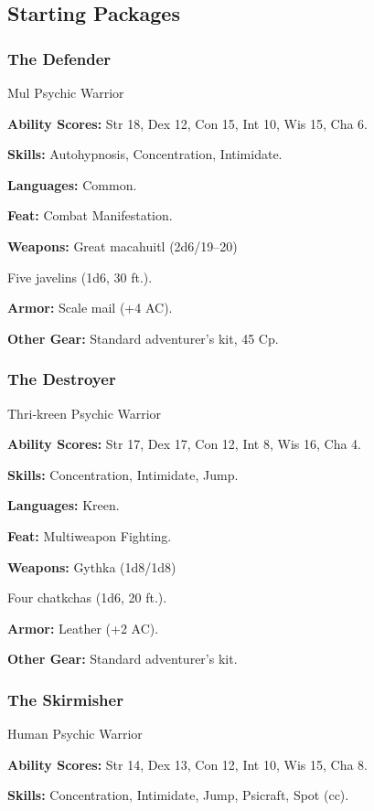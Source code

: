 \subsection{Starting Packages}
\subsubsection{The Defender}

Mul Psychic Warrior

\textbf{Ability Scores:} Str 18, Dex 12, Con 15, Int 10, Wis 15, Cha 6.

\textbf{Skills:} Autohypnosis, Concentration, Intimidate.

\textbf{Languages:} Common.

\textbf{Feat:} Combat Manifestation.

\textbf{Weapons:} Great macahuitl (2d6/19–20)

Five javelins (1d6, 30 ft.).

\textbf{Armor:} Scale mail (+4 AC).

\textbf{Other Gear:} Standard adventurer’s kit, 45 Cp.

\subsubsection{The Destroyer}

Thri‐kreen Psychic Warrior

\textbf{Ability Scores:} Str 17, Dex 17, Con 12, Int 8, Wis 16, Cha 4.

\textbf{Skills:} Concentration, Intimidate, Jump.

\textbf{Languages:} Kreen.

\textbf{Feat:} Multiweapon Fighting.

\textbf{Weapons:} Gythka (1d8/1d8)

Four chatkchas (1d6, 20 ft.).

\textbf{Armor:} Leather (+2 AC).

\textbf{Other Gear:} Standard adventurer’s kit.

\subsubsection{The Skirmisher}

Human Psychic Warrior

\textbf{Ability Scores:} Str 14, Dex 13, Con 12, Int 10, Wis 15, Cha 8.

\textbf{Skills:} Concentration, Intimidate, Jump, Psicraft, Spot (cc).

